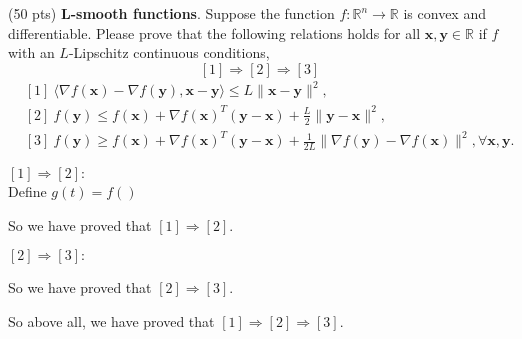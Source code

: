 \item {\color{red} (50 pts)} \textbf{L-smooth functions}. Suppose the function $f: \mathbb{R}^n \rightarrow \mathbb{R}$ is convex and differentiable. Please prove that the following relations holds for all $\mathbf{x}, \mathbf{y} \in \mathbb{R}$ if $f$ with an $L$-Lipschitz continuous conditions,
$$[1] \Rightarrow[2] \Rightarrow[3]$$
\begin{align*}
    & [1]\  \langle\nabla f(\mathbf{x})-\nabla f(\mathbf{y}), \mathbf{x}-\mathbf{y}\rangle \leq L\|\mathbf{x}-\mathbf{y}\|^2,\\
    & [2]\  f(\mathbf{y}) \leq f(\mathbf{x})+\nabla f(\mathbf{x})^T(\mathbf{y}-\mathbf{x})+\frac{L}{2}\|\mathbf{y}-\mathbf{x}\|^2,\\
    & [3]\  f(\mathbf{y}) \geq f(\mathbf{x})+\nabla f(\mathbf{x})^T(\mathbf{y}-\mathbf{x})+\frac{1}{2 L}\|\nabla f(\mathbf{y})-\nabla f(\mathbf{x})\|^2, \forall \mathbf{x}, \mathbf{y}.
\end{align*}

\solution{}
$[1] \Rightarrow[2]:$\\
Define $g(t)=f()$












So we have proved that $[1] \Rightarrow[2]$.

$[2] \Rightarrow[3]:$







So we have proved that $[2] \Rightarrow[3]$.

So above all, we have proved that $[1] \Rightarrow[2] \Rightarrow[3]$.

\newpage